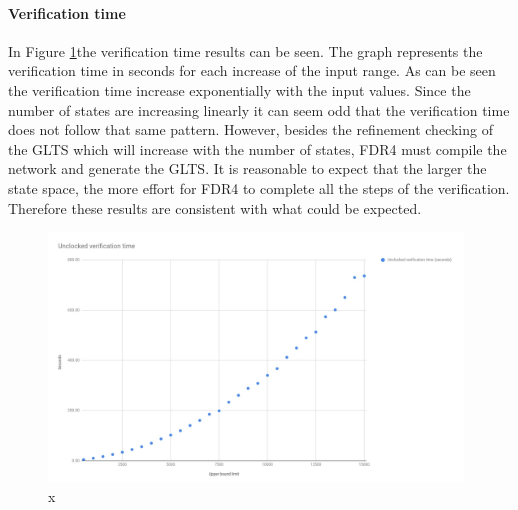 \paragraph{Verification time}
In Figure \ref{fig:unclocked_verification}the verification time results can be seen. The graph represents the verification time in seconds for each increase of the input range. As can be seen the verification time increase exponentially with the input values. Since the number of states are increasing linearly it can seem odd that the verification time does not follow that same pattern. However, besides the refinement checking of the GLTS which will increase with the number of states, FDR4 must compile the network and generate the GLTS. It is reasonable to expect that the larger the state space, the more effort for FDR4 to complete all the steps of the verification. Therefore these results are consistent with what could be expected.
\begin{figure}
    \includegraphics[width=0.98\textwidth]{./figures/15-11-2018/unclocked_verification_time.jpg}
\caption{x}
\label{fig:unclocked_verification}
\end{figure}
